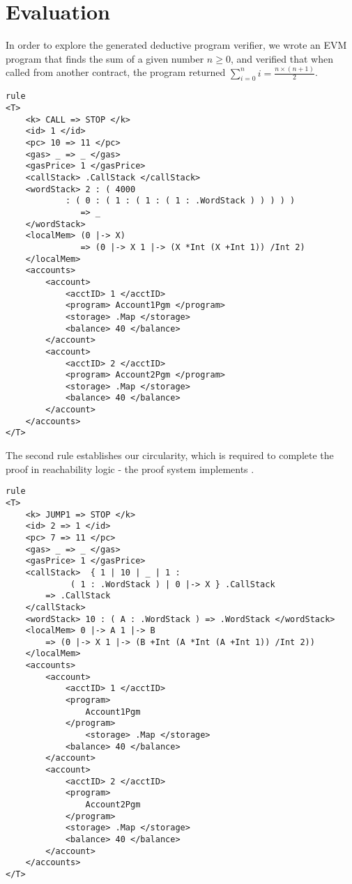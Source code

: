 \section{Evaluation}
In order to explore the generated deductive program verifier, we wrote an EVM
program that finds the sum of a given number $n \geq 0 $, and verified that when called from another contract, the
program returned $ \sum_{i = 0}^{n} i =  \frac{n \times  (n + 1 )}{2}$. 

\begin{verbatim}
rule
<T> 
    <k> CALL => STOP </k> 
    <id> 1 </id> 
    <pc> 10 => 11 </pc> 
    <gas> _ => _ </gas>
    <gasPrice> 1 </gasPrice> 
    <callStack> .CallStack </callStack> 
    <wordStack> 2 : ( 4000 
            : ( 0 : ( 1 : ( 1 : ( 1 : .WordStack ) ) ) ) ) 
               => _ 
    </wordStack> 
    <localMem> (0 |-> X) 
               => (0 |-> X 1 |-> (X *Int (X +Int 1)) /Int 2) 
    </localMem>
    <accounts>
        <account>     
            <acctID> 1 </acctID> 
            <program> Account1Pgm </program>
            <storage> .Map </storage>
            <balance> 40 </balance> 
        </account>
        <account>
            <acctID> 2 </acctID> 
            <program> Account2Pgm </program>
            <storage> .Map </storage>
            <balance> 40 </balance> 
        </account>
    </accounts>
</T>
\end{verbatim}


The second rule establishes our circularity, which is required to complete the proof in reachability logic - the proof system \K{} implements \cite{stefanescu-park-yuwen-li-rosu-2016-oopsla}. 
\begin{verbatim}
rule
<T> 
    <k> JUMP1 => STOP </k> 
    <id> 2 => 1 </id> 
    <pc> 7 => 11 </pc> 
    <gas> _ => _ </gas>
    <gasPrice> 1 </gasPrice> 
    <callStack>  { 1 | 10 | _ | 1 : 
             ( 1 : .WordStack ) | 0 |-> X } .CallStack
        => .CallStack  
    </callStack> 
    <wordStack> 10 : ( A : .WordStack ) => .WordStack </wordStack>
    <localMem> 0 |-> A 1 |-> B 
        => (0 |-> X 1 |-> (B +Int (A *Int (A +Int 1)) /Int 2)) 
    </localMem>
    <accounts>
        <account>     
            <acctID> 1 </acctID> 
            <program>
                Account1Pgm 
            </program>
                <storage> .Map </storage>
            <balance> 40 </balance> 
        </account>
        <account>
            <acctID> 2 </acctID> 
            <program> 
                Account2Pgm
            </program>  
            <storage> .Map </storage>
            <balance> 40 </balance> 
        </account>
    </accounts>
</T>

\end{verbatim}

